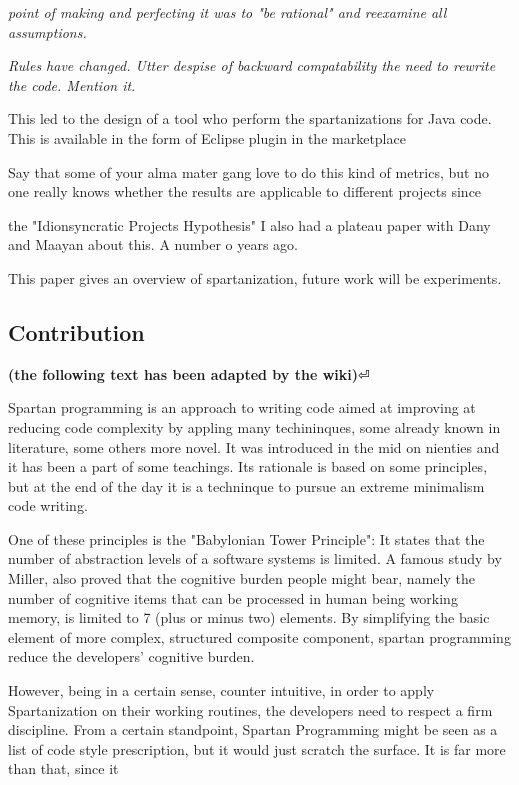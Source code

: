 \emph{point of making and perfecting it was to "be rational" and
reexamine all assumptions.}

\emph{Rules have changed.
Utter despise of backward compatability the need to rewrite the code.
Mention it.} 


This led to the design of a tool who perform the spartanizations for Java code.
This is available in the form of Eclipse plugin in the 
marketplace

Say that some of your alma mater gang love to do this kind of metrics, but
no one really knows whether the results are applicable to different projects
since \cite{Turnu:Concas:Marchesi:Tonelli:11}

the "Idionsyncratic Projects Hypothesis" I also had a plateau paper with
Dany and Maayan about this. A number o years ago.

This paper gives an overview of spartanization, future work will be
experiments.

\subsection{Contribution}

\textbf{(the following text has been adapted by the wiki)}⏎

Spartan programming is an approach to writing code aimed at improving at
reducing code complexity by appling many techininques, some already known in
literature, some others more novel. It was introduced in the mid on nienties
and it has been a part of some teachings. Its rationale is based on some
principles, but at the end of the day it is a techninque to pursue an extreme
minimalism code writing.

One of these principles is the "Babylonian Tower Principle": It states that the
number of abstraction levels of a software systems is limited. A famous study
by Miller, also proved that the cognitive burden people might bear, namely the
number of cognitive items that can be processed in human being working memory,
is limited to 7 (plus or minus two) elements. By simplifying the basic element
of more complex, structured composite component, spartan programming reduce the
developers' cognitive burden.

However, being in a certain sense, counter intuitive, in order to apply
Spartanization on their working routines, the developers need to respect a firm
discipline. From a certain standpoint, Spartan Programming might be seen as a
list of code style prescription, but it would just scratch the surface. It is
far more than that, since it

